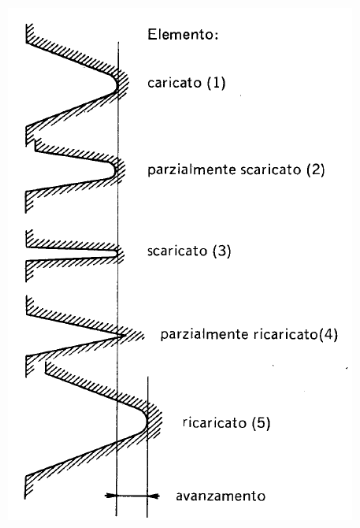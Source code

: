 		\begin{figure}[H]
			\centering
			\begin{subfigure}{0.3\textwidth}
				\centering
			\includegraphics[width=\linewidth]{immagini_10/screenshot008}
\label{fig:screenshot008}
			\end{subfigure}%
			\begin{subfigure}{0.3\textwidth}
				\centering

\end{subfigure}
\end{figure}
